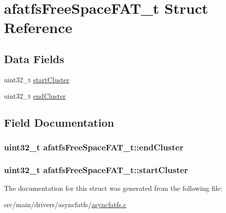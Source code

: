 \hypertarget{structafatfsFreeSpaceFAT__t}{\section{afatfs\+Free\+Space\+F\+A\+T\+\_\+t Struct Reference}
\label{structafatfsFreeSpaceFAT__t}
}
\subsection*{Data Fields}
\begin{DoxyCompactItemize}
\item 
uint32\+\_\+t \hyperlink{structafatfsFreeSpaceFAT__t_a15be72c9f1a348fa778864c8ae3702b7}{start\+Cluster}
\item 
uint32\+\_\+t \hyperlink{structafatfsFreeSpaceFAT__t_a8c4a170d6fa726203d6ec96e2b73a484}{end\+Cluster}
\end{DoxyCompactItemize}


\subsection{Field Documentation}
\hypertarget{structafatfsFreeSpaceFAT__t_a8c4a170d6fa726203d6ec96e2b73a484}{
\subsubsection[{end\+Cluster}]{\setlength{\rightskip}{0pt plus 5cm}uint32\+\_\+t afatfs\+Free\+Space\+F\+A\+T\+\_\+t\+::end\+Cluster}}\label{structafatfsFreeSpaceFAT__t_a8c4a170d6fa726203d6ec96e2b73a484}
\hypertarget{structafatfsFreeSpaceFAT__t_a15be72c9f1a348fa778864c8ae3702b7}{
\subsubsection[{start\+Cluster}]{\setlength{\rightskip}{0pt plus 5cm}uint32\+\_\+t afatfs\+Free\+Space\+F\+A\+T\+\_\+t\+::start\+Cluster}}\label{structafatfsFreeSpaceFAT__t_a15be72c9f1a348fa778864c8ae3702b7}


The documentation for this struct was generated from the following file\+:\begin{DoxyCompactItemize}
\item 
src/main/drivers/asyncfatfs/\hyperlink{asyncfatfs_8c}{asyncfatfs.\+c}\end{DoxyCompactItemize}
